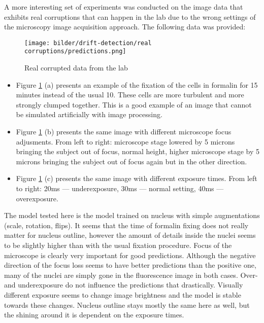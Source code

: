A more interesting set of experiments was conducted on the image data that exhibits real corruptions that can happen in the lab due to the wrong settings of the microscopy image acquisition approach. The following data was provided: 
\begin{figure}[htb]
	\begin{center}
		\texttt{[image: bilder/drift-detection/real corruptions/predictions.png]}
		\caption{Real corrupted data from the lab}\label{fig:real-corruptions-predictions}
	\end{center}
\end{figure}


\begin{itemize}
    \item Figure \ref{fig:real-corruptions-predictions} (a) presents an example of the fixation of the cells in formalin for 15 minutes instead of the usual 10. These cells are more turbulent and more strongly clumped together. This is a good example of an image that cannot be simulated artificially with image processing.
    
    \item Figure \ref{fig:real-corruptions-predictions} (b) presents the same image with different microscope focus adjusments. From left to right: microscope stage lowered by 5 microns bringing the subject out of focus, normal height, higher microscope stage by 5 microns bringing the subject out of focus again but in the other direction.
    
    \item Figure \ref{fig:real-corruptions-predictions} (c) presents the same image with different exposure times. From left to right: 20ms --- underexposure, 30ms --- normal setting, 40ms --- overexposure.
\end{itemize}

The model tested here is the model trained on nucleus with simple augmentations (scale, rotation, flips). It seems that the time of formalin fixing does not really matter for nucleus outline, however the amount of details inside the nuclei seems to be slightly higher than with the usual fixation procedure. Focus of the microscope is clearly very important for good predictions. Although the negative direction of the focus loss seems to have better predictions than the positive one, many of the nuclei are simply gone in the fluorescence image in both cases. Over- and underexposure do not influence the predictions that drastically. Visually different exposure seems to change image brightness and the model is stable towards these changes. Nucleus outline stays mostly the same here as well, but the shining around it is dependent on the exposure times.
